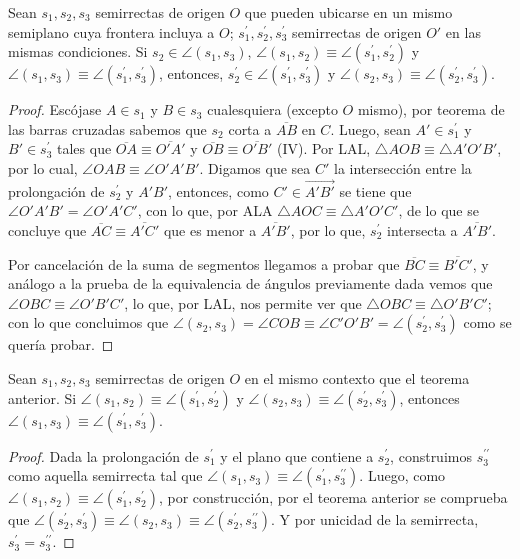 \documentclass[11pt,a4paper]{book}
\begin{document}
\begin{thm}\label{thm:angle-sum-1}
Sean $s_1,s_2,s_3$ semirrectas de origen $O$ que pueden ubicarse en un mismo semiplano cuya frontera incluya a $O$; $s_1^\prime, s_2^\prime, s_3^\prime$ semirrectas de origen $O'$ en las mismas condiciones. Si $s_2\in\angle(s_1,s_3)$, $\angle(s_1,s_2)\equiv\angle(s_1^\prime,s_2^\prime)$ y $\angle(s_1,s_3)\equiv\angle(s_1^\prime,s_3^\prime)$, entonces, $s_2^\prime\in\angle(s_1^\prime,s_3^\prime)$ y $\angle(s_2,s_3)\equiv\angle(s_2^\prime,s_3^\prime)$.
\end{thm}
\begin{proof}
Escójase $A\in s_1$ y $B\in s_3$ cualesquiera (excepto $O$ mismo), por teorema de las barras cruzadas sabemos que $s_2$ corta a $\overline{AB}$ en $C$. Luego, sean $A'\in s_1^\prime$ y $B'\in s_3^\prime$ tales que $\overline{OA}\equiv\overline{O'A'}$ y $\overline{OB}\equiv\overline{O'B'}$ (IV). Por LAL, $\triangle AOB\equiv\triangle A'O'B'$, por lo cual, $\angle OAB\equiv\angle O'A'B'$. Digamos que sea $C'$ la intersección entre la prolongación de $s_2^\prime$ y $A'B'$, entonces, como $C'\in\overrightarrow{A'B'}$ se tiene que $\angle O'A'B'=\angle O'A'C'$, con lo que, por ALA $\triangle AOC\equiv\triangle A'O'C'$, de lo que se concluye que $\overline{AC}\equiv\overline{A'C'}$ que es menor a $\overline{A'B'}$, por lo que, $s_2^\prime$ intersecta a $\overline{A'B'}$.

Por cancelación de la suma de segmentos llegamos a probar que $\overline{BC}\equiv\overline{B'C'}$, y análogo a la prueba de la equivalencia de ángulos previamente dada vemos que $\angle OBC\equiv\angle O'B'C'$, lo que, por LAL, nos permite ver que $\triangle OBC\equiv\triangle O'B'C'$; con lo que concluimos que $\angle(s_2,s_3)=\angle COB\equiv\angle C'O'B'=\angle(s_2^\prime,s_3^\prime)$ como se quería probar.
\end{proof}
\begin{thm}\label{thm:angle-sum-2}
Sean $s_1,s_2,s_3$ semirrectas de origen $O$ en el mismo contexto que el teorema anterior. Si $\angle(s_1,s_2)\equiv\angle(s_1^\prime, s_2^\prime)$ y $\angle(s_2,s_3)\equiv\angle(s_2^\prime,s_3^\prime)$, entonces $\angle(s_1,s_3)\equiv\angle(s_1^\prime, s_3^\prime)$.
\end{thm}
\begin{proof}
Dada la prolongación de $s_1^\prime$ y el plano que contiene a $s_2^\prime$, construimos $s_3^{\prime\prime}$ como aquella semirrecta tal que $\angle(s_1,s_3)\equiv\angle(s_1^\prime,s_3^{\prime\prime})$. Luego, como $
\angle(s_1,s_2)\equiv\angle(s_1^\prime,s_2^\prime)$, por construcción, por el teorema anterior se comprueba que $\angle(s_2^\prime,s_3^\prime)\equiv\angle(s_2,s_3)\equiv\angle(s_2^\prime,s_3^{\prime\prime})$. Y por unicidad de la semirrecta, $s_3^\prime=s_3^{\prime\prime}$.
\end{proof}
\end{document}
